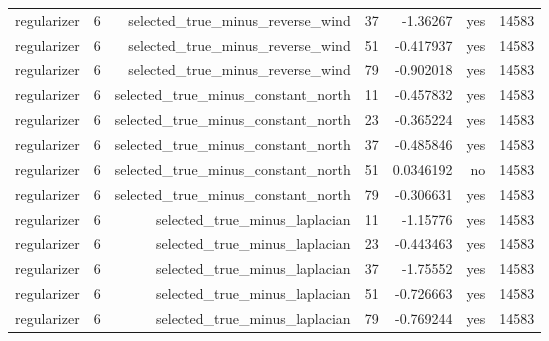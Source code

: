 \begin{tabular}{lrrrrrr}
regularizer & 6 & selected\_true\_minus\_reverse\_wind & 37 & -1.36267 & yes & 14583 \\
regularizer & 6 & selected\_true\_minus\_reverse\_wind & 51 & -0.417937 & yes & 14583 \\
regularizer & 6 & selected\_true\_minus\_reverse\_wind & 79 & -0.902018 & yes & 14583 \\
regularizer & 6 & selected\_true\_minus\_constant\_north & 11 & -0.457832 & yes & 14583 \\
regularizer & 6 & selected\_true\_minus\_constant\_north & 23 & -0.365224 & yes & 14583 \\
regularizer & 6 & selected\_true\_minus\_constant\_north & 37 & -0.485846 & yes & 14583 \\
regularizer & 6 & selected\_true\_minus\_constant\_north & 51 & 0.0346192 & no & 14583 \\
regularizer & 6 & selected\_true\_minus\_constant\_north & 79 & -0.306631 & yes & 14583 \\
regularizer & 6 & selected\_true\_minus\_laplacian & 11 & -1.15776 & yes & 14583 \\
regularizer & 6 & selected\_true\_minus\_laplacian & 23 & -0.443463 & yes & 14583 \\
regularizer & 6 & selected\_true\_minus\_laplacian & 37 & -1.75552 & yes & 14583 \\
regularizer & 6 & selected\_true\_minus\_laplacian & 51 & -0.726663 & yes & 14583 \\
regularizer & 6 & selected\_true\_minus\_laplacian & 79 & -0.769244 & yes & 14583 \\
\hline
\end{tabular}
